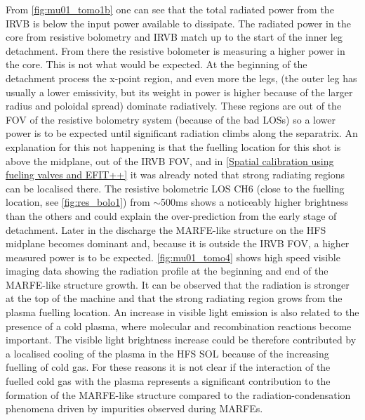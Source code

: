 From \autoref{fig:mu01_tomo1b} one can see that the total radiated power from the IRVB is below the input power available to dissipate. The radiated power in the core from resistive bolometry and IRVB match up to the start of the inner leg detachment. From there the resistive bolometer is measuring a higher power in the core. This is not what would be expected. At the beginning of the detachment process the x-point region, and even more the legs, (the outer leg has usually a lower emissivity, but its weight in power is higher because of the larger radius and poloidal spread) dominate radiatively. These regions are out of the FOV of the resistive bolometry system (because of the bad LOSs) so a lower power is to be expected until significant radiation climbs along the separatrix. An explanation for this not happening is that the fuelling location for this shot is above the midplane, out of the IRVB FOV, and in \autoref{Spatial calibration using fueling valves and EFIT++} it was already noted that strong radiating regions can be localised there. The resistive bolometric LOS CH6 (close to the fuelling location, see \autoref{fig:res_bolo1}) from $\sim$500ms shows a noticeably higher brightness than the others and could explain the over-prediction from the early stage of detachment. Later in the discharge the MARFE-like structure on the HFS midplane becomes dominant and, because it is outside the IRVB FOV, a higher measured power is to be expected. \autoref{fig:mu01_tomo4} shows high speed visible imaging data showing the radiation profile at the beginning and end of the MARFE-like structure growth. It can be observed that the radiation is stronger at the top of the machine and that the strong radiating region grows from the plasma fuelling location. An increase in visible light emission is also related to the presence of a cold plasma, where molecular and recombination reactions become important. The visible light brightness increase could be therefore contributed by a localised cooling of the plasma in the HFS SOL because of the increasing fuelling of cold gas. For these reasons it is not clear if the interaction of the fuelled cold gas with the plasma represents a significant contribution to the formation of the MARFE-like structure compared to the radiation-condensation phenomena driven by impurities observed during MARFEs.\cite{Lipschultz1984}

